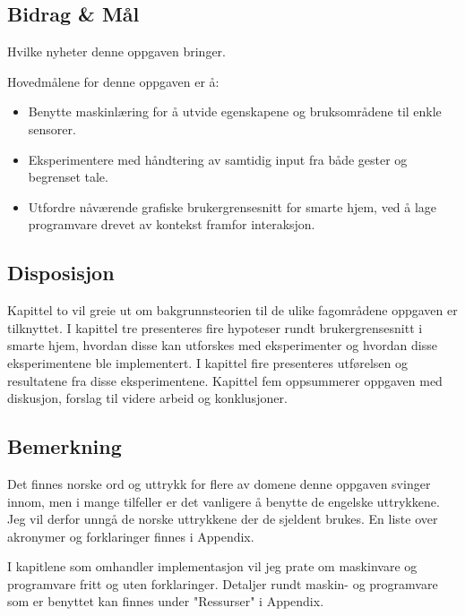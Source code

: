 \subsection*{Bidrag \& Mål}
{\color{red}Hvilke nyheter denne oppgaven bringer.}

Hovedmålene for denne oppgaven er å:
\begin{itemize}
\item Benytte maskinlæring for å utvide egenskapene og bruksområdene til enkle sensorer.
\item Eksperimentere med håndtering av samtidig input fra både gester og begrenset tale.
\item Utfordre nåværende grafiske brukergrensesnitt for smarte hjem, ved å lage programvare drevet av kontekst framfor interaksjon.
\end{itemize}

\subsection*{Disposisjon}
Kapittel to vil greie ut om bakgrunnsteorien til de ulike fagområdene oppgaven er tilknyttet. I kapittel tre presenteres fire hypoteser rundt brukergrensesnitt i smarte hjem, hvordan disse kan utforskes med eksperimenter og hvordan disse eksperimentene ble implementert. I kapittel fire presenteres utførelsen og resultatene fra disse eksperimentene. Kapittel fem oppsummerer oppgaven med diskusjon, forslag til videre arbeid og konklusjoner.

\subsection*{Bemerkning}
Det finnes norske ord og uttrykk for flere av domene denne oppgaven svinger innom, men i mange tilfeller er det vanligere å benytte de engelske uttrykkene. Jeg vil derfor unngå de norske uttrykkene der de sjeldent brukes. En liste over akronymer og forklaringer finnes i Appendix.

I kapitlene som omhandler implementasjon vil jeg prate om maskinvare og programvare fritt og uten forklaringer. Detaljer rundt maskin- og programvare som er benyttet kan finnes under "Ressurser" i Appendix.